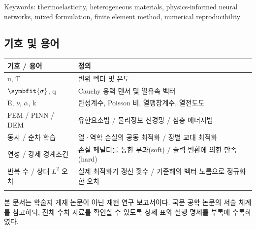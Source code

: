 \documentclass[10pt,a4paper]{article}
\renewcommand{\boldsymbol}[1]{\symbfit{#1}}
\begin{document}
{\small\color{muted} Keywords: thermoelasticity, heterogeneous materials, physics-informed neural networks, mixed formulation, finite element method, numerical reproducibility\par}

\subsection{기호 및 용어}

\begingroup\small

\par\begin{minipage}{\linewidth}\begin{tabular}{>{\raggedright\arraybackslash}p{}>{\raggedright\arraybackslash}p{}}

\rowcolor{tint} \textbf{기호 / 용어} & \textbf{정의}\\\midrule

u, T & 변위 벡터 및 온도\\\addlinespace[2pt]

$\boldsymbol{\sigma}$, q & Cauchy 응력 텐서 및 열유속 벡터\\\addlinespace[2pt]

E, $\nu$, $\alpha$, k & 탄성계수, Poisson 비, 열팽창계수, 열전도도\\\addlinespace[2pt]

FEM / PINN / DEM & 유한요소법 / 물리정보 신경망 / 심층 에너지법\\\addlinespace[2pt]

동시 / 순차 학습 & 열·역학 손실의 공동 최적화 / 장별 교대 최적화\\\addlinespace[2pt]

연성 / 강제 경계조건 & 손실 페널티를 통한 부과(soft) / 출력 변환에 의한 만족(hard)\\\addlinespace[2pt]

반복 수 / 상대 $L^2$ 오차 & 실제 최적화기 갱신 횟수 / 기준해의 벡터 노름으로 정규화한 오차\\\addlinespace[2pt]

\bottomrule\end{tabular}\end{minipage}\par\vspace{5pt}\endgroup

{\small\color{muted} 본 문서는 학술지 게재 논문이 아닌 재현 연구 보고서이다. 국문 공학 논문의 서술 체계를 참고하되, 전체 수치 자료를 확인할 수 있도록 상세 표와 실행 명세를 부록에 수록하였다.\par}
\end{document}
